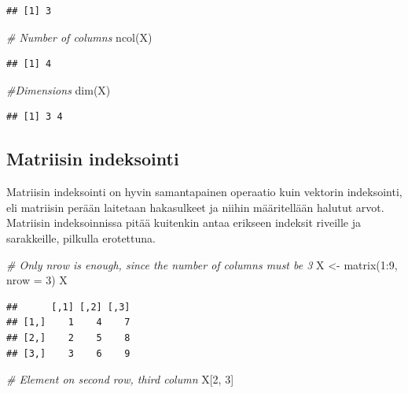 \documentclass[
]{book}
\newenvironment{Shaded}{\begin{snugshade}}{\end{snugshade}}
\newcommand{\AttributeTok}[1]{\textcolor[rgb]{0.77,0.63,0.00}{#1}}
\newcommand{\CommentTok}[1]{\textcolor[rgb]{0.56,0.35,0.01}{\textit{#1}}}
\newcommand{\DecValTok}[1]{\textcolor[rgb]{0.00,0.00,0.81}{#1}}
\newcommand{\FunctionTok}[1]{\textcolor[rgb]{0.00,0.00,0.00}{#1}}
\newcommand{\NormalTok}[1]{#1}
\newcommand{\OtherTok}[1]{\textcolor[rgb]{0.56,0.35,0.01}{#1}}
\newcommand{\SpecialCharTok}[1]{\textcolor[rgb]{0.00,0.00,0.00}{#1}}
\begin{document}
\begin{verbatim}
## [1] 3
\end{verbatim}

\begin{Shaded}
\begin{Highlighting}[]
\CommentTok{\# Number of columns}
\FunctionTok{ncol}\NormalTok{(X)}
\end{Highlighting}
\end{Shaded}

\begin{verbatim}
## [1] 4
\end{verbatim}

\begin{Shaded}
\begin{Highlighting}[]
\CommentTok{\#Dimensions}
\FunctionTok{dim}\NormalTok{(X)}
\end{Highlighting}
\end{Shaded}

\begin{verbatim}
## [1] 3 4
\end{verbatim}

\hypertarget{matriisin-indeksointi}{%
\subsection{Matriisin indeksointi}\label{matriisin-indeksointi}}

Matriisin indeksointi on hyvin samantapainen operaatio kuin vektorin indeksointi, eli matriisin perään laitetaan hakasulkeet ja niihin määritellään halutut arvot. Matriisin indeksoinnissa pitää kuitenkin antaa erikseen indeksit riveille ja sarakkeille, pilkulla erotettuna.

\begin{Shaded}
\begin{Highlighting}[]
\CommentTok{\# Only nrow is enough, since the number of columns must be 3}
\NormalTok{X }\OtherTok{\textless{}{-}} \FunctionTok{matrix}\NormalTok{(}\DecValTok{1}\SpecialCharTok{:}\DecValTok{9}\NormalTok{, }\AttributeTok{nrow =} \DecValTok{3}\NormalTok{)}
\NormalTok{X}
\end{Highlighting}
\end{Shaded}

\begin{verbatim}
##      [,1] [,2] [,3]
## [1,]    1    4    7
## [2,]    2    5    8
## [3,]    3    6    9
\end{verbatim}

\begin{Shaded}
\begin{Highlighting}[]
\CommentTok{\# Element on second row, third column}
\NormalTok{X[}\DecValTok{2}\NormalTok{, }\DecValTok{3}\NormalTok{]}
\end{Highlighting}
\end{Shaded}
\end{document}
